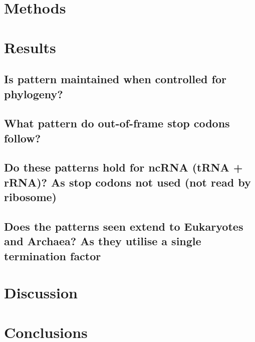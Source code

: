 \documentclass[
    emulatestandardclasses,
    parskip=half,
]{scrartcl}
\begin{document}




    \section{Methods}

    \section{Results}
        \subsection{Is pattern maintained when controlled for phylogeny?}
        \subsection{What pattern do out-of-frame stop codons follow?}
        \subsection{Do these patterns hold for ncRNA (tRNA + rRNA)?
                    As stop codons not used (not read by ribosome)}
        \subsection{Does the patterns seen extend to Eukaryotes and Archaea?
                    As they utilise a single termination factor}
    \section{Discussion}

    \section{Conclusions}

	\newpage {}
	\printbibliography
	\appendix\appendixpage
\end{document}
